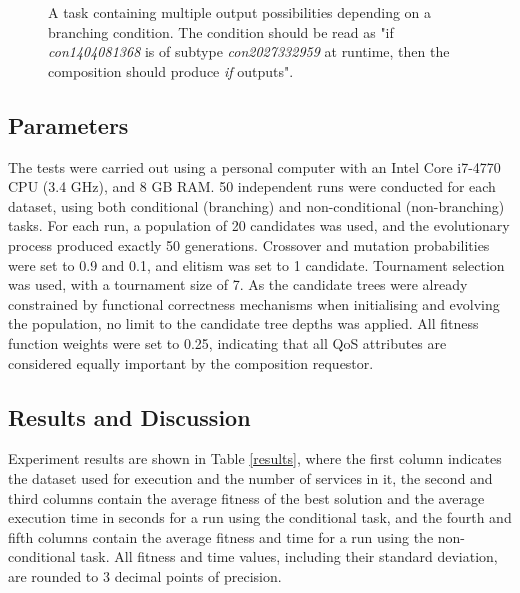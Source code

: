 \documentclass[conference]{IEEEtran}
\begin{document}
\begin{figure}
\centerline{
}
 \caption{A task containing multiple output possibilities depending on a branching condition. The condition should be read as "if \textit{con1404081368} is of subtype \textit{con2027332959} at runtime, then the composition should produce \textit{if} outputs".}
 \label{fig:task}
\end{figure}


\subsection{Parameters}
The tests were carried out using a personal computer with an Intel Core i7-4770 CPU (3.4 GHz), and 8 GB RAM. 50 independent runs were conducted for each dataset, using both conditional (branching) and non-conditional (non-branching) tasks. For each run, a population of 20 candidates was used, and the evolutionary process produced exactly 50 generations. Crossover and mutation probabilities were set to 0.9 and 0.1, and elitism was set to 1 candidate. Tournament selection was used, with a tournament size of 7. As the candidate trees were already constrained by functional correctness mechanisms when initialising and evolving the population, no limit to the candidate tree depths was applied. All fitness function weights were set to 0.25, indicating that all QoS attributes are considered equally important by the composition requestor.

\subsection{Results and Discussion}

Experiment results are shown in Table \ref{results}, where the first column indicates the dataset used for execution and the number of services in it, the second and third columns contain the average fitness of the best solution and the average execution time in seconds for a run using the conditional task, and the fourth and fifth columns contain the average fitness and time for a run using the non-conditional task. All fitness and time values, including their standard deviation, are rounded to 3 decimal points of precision.
\end{document}
